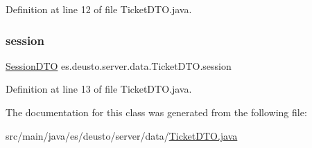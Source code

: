 Definition at line 12 of file Ticket\+D\+T\+O.\+java.

\mbox{\label{classes_1_1deusto_1_1server_1_1data_1_1_ticket_d_t_o_a9d76a5dad7b29b3ea22f11df64f75483}} 
\subsubsection{\texorpdfstring{session}{session}}
{\footnotesize\ttfamily \mbox{\hyperlink{classes_1_1deusto_1_1server_1_1data_1_1_session_d_t_o}{Session\+D\+TO}} es.\+deusto.\+server.\+data.\+Ticket\+D\+T\+O.\+session}



Definition at line 13 of file Ticket\+D\+T\+O.\+java.



The documentation for this class was generated from the following file\+:\begin{DoxyCompactItemize}
\item 
src/main/java/es/deusto/server/data/\mbox{\hyperlink{_ticket_d_t_o_8java}{Ticket\+D\+T\+O.\+java}}\end{DoxyCompactItemize}
